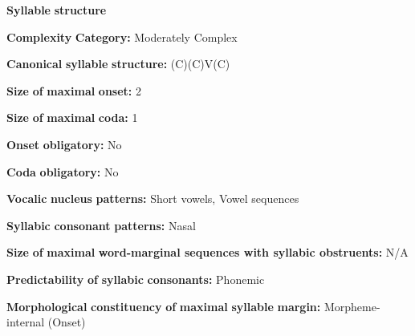 \documentclass[output=paper]{langsci/langscibook}
\begin{document}
\begin{styleBody}
\textbf{Syllable} \textbf{structure}
\end{styleBody}

\begin{styleBody}
\textbf{Complexity} \textbf{Category:} Moderately Complex
\end{styleBody}

\begin{styleBody}
\textbf{Canonical} \textbf{syllable} \textbf{structure:} (C)(C)V(C) \citep[38-9]{Ameka1991}
\end{styleBody}

\begin{styleBody}
\textbf{Size} \textbf{of} \textbf{maximal} \textbf{onset:} 2
\end{styleBody}

\begin{styleBody}
\textbf{Size} \textbf{of} \textbf{maximal} \textbf{coda:} 1
\end{styleBody}

\begin{styleBody}
\textbf{Onset} \textbf{obligatory:} No
\end{styleBody}

\begin{styleBody}
\textbf{Coda} \textbf{obligatory:} No
\end{styleBody}

\begin{styleBody}
\textbf{Vocalic} \textbf{nucleus} \textbf{patterns:} Short vowels, Vowel sequences
\end{styleBody}

\begin{styleBody}
\textbf{Syllabic} \textbf{consonant} \textbf{patterns:} Nasal
\end{styleBody}

\begin{styleBody}
\textbf{Size} \textbf{of} \textbf{maximal} \textbf{word{}-marginal sequences with syllabic obstruents:} N/A
\end{styleBody}

\begin{styleBody}
\textbf{Predictability} \textbf{of} \textbf{syllabic} \textbf{consonants:} Phonemic
\end{styleBody}

\begin{styleBody}
\textbf{Morphological} \textbf{constituency} \textbf{of} \textbf{maximal} \textbf{syllable} \textbf{margin:} Morpheme-internal (Onset)
\end{styleBody}
\end{document}
